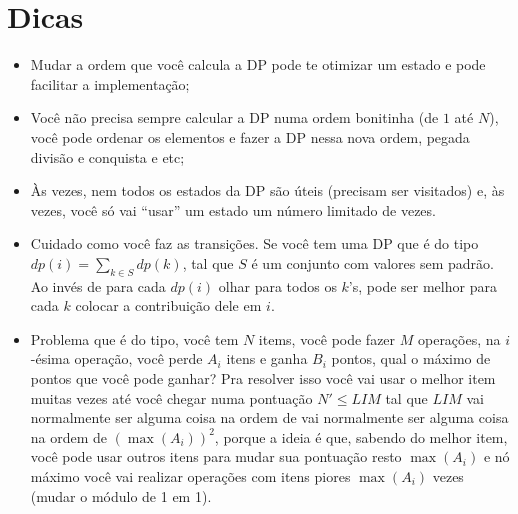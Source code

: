 \section{Dicas}
\begin{itemize}
    \item Mudar a ordem que você calcula a DP pode te otimizar um estado e pode facilitar a implementação;
    \item Você não precisa sempre calcular a DP numa ordem bonitinha (de $1$ até $N$), você pode ordenar os elementos e fazer a DP nessa nova ordem, pegada divisão e conquista e etc;
    \item Às vezes, nem todos os estados da DP são úteis (precisam ser visitados) e, às vezes, você só vai ``usar'' um estado um número limitado de vezes.
    \item Cuidado como você faz as transições. Se você tem uma DP que é do tipo $dp(i) = \sum_{k \in S}dp(k)$, tal que $S$ é um conjunto com valores sem padrão. Ao invés de para cada $dp(i)$ olhar para todos os $k$'s, pode ser melhor para cada  $k$ colocar a contribuição dele em $i$.
    \item Problema que é do tipo, você tem $N$ items, você pode fazer $M$ operações, na $i$-ésima operação, você perde $A_i$ itens e ganha $B_i$ pontos, qual o máximo de pontos que você pode ganhar? Pra resolver isso você vai usar o melhor item muitas vezes até você chegar numa pontuação $N' \leq LIM$ tal que $LIM$ vai normalmente ser alguma coisa na ordem de vai normalmente ser alguma coisa na ordem de $(\max(A_i))^2$, porque a ideia é que, sabendo do melhor item, você pode usar outros itens para mudar sua pontuação resto $\max(A_i)$ e nó máximo você vai realizar operações com itens piores $\max(A_i)$ vezes (mudar o módulo de 1 em 1).
\end{itemize}